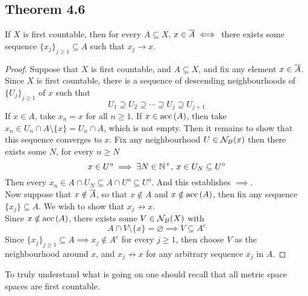 \documentclass[../../main.tex]{subfiles}
\begin{document}
\subsection{Theorem 4.6}
\begin{wts}
    If $X$ is first countable, then for every $A\subseteq X$, $x\in \overline{A}\iff$ there exists some sequence $\{x_j\}_{j\geq 1}\subseteq A$ such that $x_j\to x$.
\end{wts}
\begin{proof}
    Suppose that $X$ is first countable, and $A\subseteq X$, and fix any element $x\in\overline{A}$. Since $X$ is first countable, there is a sequence of descending neighbourhoods of $\{U_j\}_{j\geq 1}$ of $x$ such that
    \[
    U_1\supseteq U_2\supseteq \cdots\supseteq U_j\supseteq U_{j+1}
    \]
    If $x\in A$, take $x_n = x$ for all $n\geq 1$. If $x\in\operatorname{acc}{(A)}$, then take $x_n\in U_n\cap A\setminus \{x\}=U_n\cap A$, which is not empty. Then it remains to show that this sequence converges to $x$. Fix any neighbourhood $U\in\mathcal{N}_B({x})$ then there exists some $N$, for every $n\geq N$
    \[
    x\in U^o\implies \exists N\in\mathbb{N}^+, \: x\in U_N\subseteq U^o
    \]
    Then every $x_n\in A\cap U_N\subseteq A\cap U^o\subseteq U^o$. And this establishes $\implies$.\\
    
    Now suppose that $x\notin \overline{A}$, so that $x\notin A$ and $x\notin \operatorname{acc}{(A)}$, then fix any sequence $\{x_j\}\subseteq A$. We wish to show that $x_j\not\to x$.\\
    
    Since $x\notin \operatorname{acc}{(A)}$, there exists some $V\in\mathcal{N}_B({X})$ with
    \[
    A\cap V\setminus\{x\}=\varnothing\implies V\subseteq A^c
    \]
    Since $\{x_j\}_{j\geq 1}\subseteq A\implies x_j\notin A^c$ for every $j\geq 1$, then choose $V$ as the neighbourhood around $x$, and $x_j\not\to x$ for any arbitrary sequence $x_j$ in $A$.
\end{proof}
\remark To truly understand what is going on one should recall that all metric space spaces are first countable.
\end{document}
